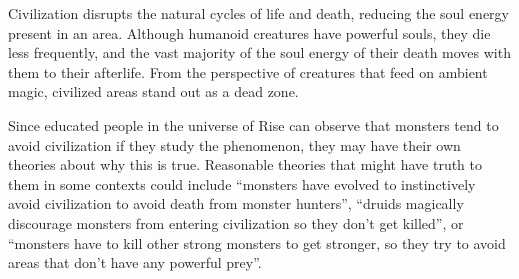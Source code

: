             Civilization disrupts the natural cycles of life and death, reducing the soul energy present in an area.
            Although humanoid creatures have powerful souls, they die less frequently, and the vast majority of the soul energy of their death moves with them to their afterlife.
            From the perspective of creatures that feed on ambient magic, civilized areas stand out as a dead zone.

            Since educated people in the universe of Rise can observe that monsters tend to avoid civilization if they study the phenomenon, they may have their own theories about why this is true.
            Reasonable theories that might have truth to them in some contexts could include ``monsters have evolved to instinctively avoid civilization to avoid death from monster hunters'', ``druids magically discourage monsters from entering civilization so they don't get killed'', or ``monsters have to kill other strong monsters to get stronger, so they try to avoid areas that don't have any powerful prey''.
